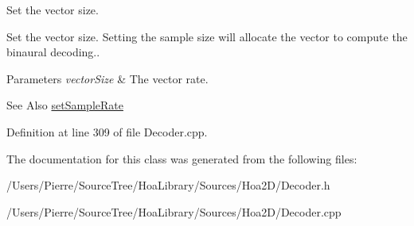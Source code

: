 Set the vector size. 

Set the vector size. Setting the sample size will allocate the vector to compute the binaural decoding..


\begin{DoxyParams}{Parameters}
{\em vector\-Size} & The vector rate.\\
\hline
\end{DoxyParams}
\begin{DoxySeeAlso}{See Also}
\hyperlink{class_hoa2_d_1_1_decoder_binaural_a6a96a705952a4165dd916c74b64b60e4}{set\-Sample\-Rate} 
\end{DoxySeeAlso}


Definition at line 309 of file Decoder.\-cpp.



The documentation for this class was generated from the following files\-:\begin{DoxyCompactItemize}
\item 
/\-Users/\-Pierre/\-Source\-Tree/\-Hoa\-Library/\-Sources/\-Hoa2\-D/Decoder.\-h\item 
/\-Users/\-Pierre/\-Source\-Tree/\-Hoa\-Library/\-Sources/\-Hoa2\-D/Decoder.\-cpp\end{DoxyCompactItemize}
